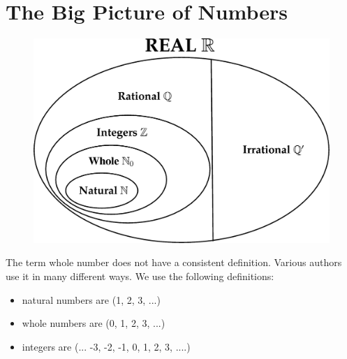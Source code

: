     \section{ The Big Picture of Numbers}
            \nopagebreak
      \label{m38348*id62547}
    \setcounter{subfigure}{0}
	\begin{figure}[H] %
    \begin{center}
    \label{m38348*id62548!!!underscore!!!media}\label{m38348*id62548!!!underscore!!!printimage}\includegraphics{col11306.imgs/m38348_MG10C3_001.png} %
      \vspace{2pt}
    \vspace{.1in}
    \end{center}
 \end{figure}       
      \par 
      \label{m38348*id62554}The term whole number does not have a consistent definition. Various authors use
it in many different ways. We use the following definitions:\par 
      \label{m38348*id62559}\begin{itemize}[noitemsep]
            \label{m38348*uid1}\item natural numbers are (1, 2, 3, ...)
\label{m38348*uid2}\item whole numbers are (0, 1, 2, 3, ...)
\label{m38348*uid3}\item integers are (... -3, -2, -1, 0, 1, 2, 3, ....)
\end{itemize}
